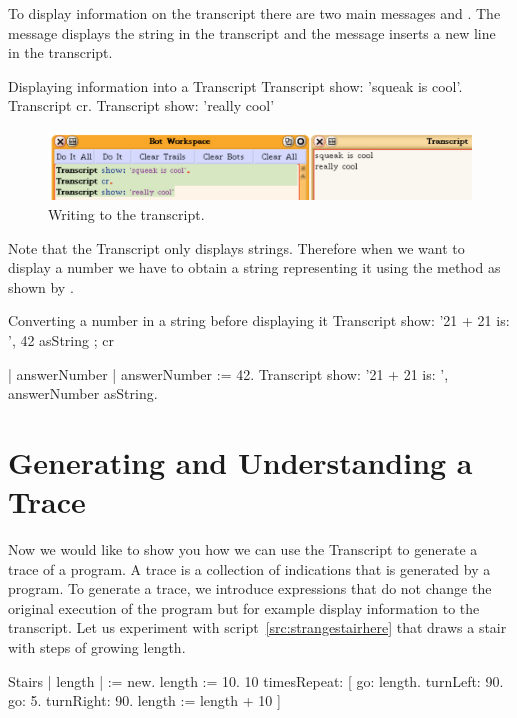 To display information on the transcript there are two main messages  and . The message  displays the string in the transcript and the message  inserts a new line in the transcript.    

\begin{scriptwithtitle}{Displaying information into a Transcript}\label{scr:transcript}
Transcript show: 'squeak is cool'.
Transcript cr.
Transcript show: 'really cool'
\end{scriptwithtitle}

\begin{figure}[h]
\begin{center}
\includegraphics[width=\linewidth]{TranscriptCool.pdf}
\caption{Writing to the transcript.}
\end{center}
\end{figure}

Note that the Transcript only displays strings. Therefore when we want to display a number we have to obtain a string representing it using the method  as shown by .

\begin{scriptwithtitle}{Converting a number in a string before displaying it}\label{src:transcriptNumber}
Transcript show: '21 + 21 is: ', 42 asString ; cr

| answerNumber |
answerNumber := 42.
Transcript show: '21 + 21 is: ', answerNumber asString.
\end{scriptwithtitle}


\section{Generating and Understanding a Trace}
Now we would like to show you how we can use the Transcript to generate a trace of a program. A trace is a collection of indications that is generated by a program. 
To generate a trace, we introduce expressions that do not change the original execution of the program but for example display information to the transcript. Let us experiment with script~\ref{src:strangestairhere} that draws a stair with steps of growing length.

\begin{scriptwithtitle}{Stairs}\label{src:strangestairhere}
| \caro length |
\caro := \Turtle new.
length := 10.
10 timesRepeat: 
                [ \caro go: length.
                \caro turnLeft: 90.
                \caro go: 5.
                \caro turnRight: 90.
                length := length + 10 ]
\end{scriptwithtitle}

